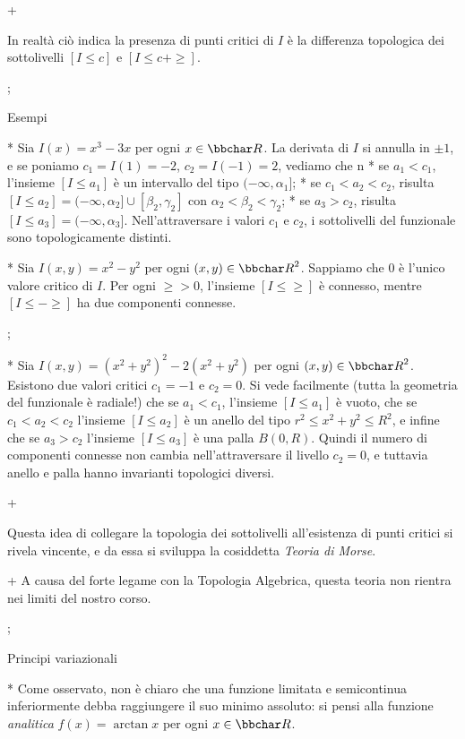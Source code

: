\pg+

In realt\`a ci\`o indica la presenza di punti critici di $I$ \`e la
differenza topologica dei sottolivelli $[I \leq c]$ e $[I \leq
c+\ge]$.

\pg;

\sec Esempi

* Sia $I(x)=x^3-3x$ per ogni $x \in \R$. La derivata di $I$ si annulla
  in $\pm 1$, e se poniamo $c_1=I(1)=-2$, $c_2=I(-1)=2$, vediamo che
  \begitems
  \style n
  * se $a_1<c_1$, l'insieme $[I \leq a_1]$ \`e un intervallo del tipo
  $(-\infty,\alpha_1]$;
  * se $c_1<a_2<c_2$, risulta $[I \leq a_2] = (-\infty,\alpha_2] \cup
  [\beta_2,\gamma_2]$ con $\alpha_2<\beta_2<\gamma_2$;
  * se $a_3>c_2$, risulta $[I \leq a_3] = (-\infty,\alpha_3]$.
  \enditems
  Nell'attraversare i valori $c_1$ e $c_2$, i sottolivelli del
  funzionale sono topologicamente distinti.

* Sia $I(x,y) = x^2-y^2$ per ogni $(x,y) \in \R^2$. Sappiamo che $0$
  \`e l'unico valore critico di $I$. Per ogni $\ge>0$, l'insieme $[I
  \leq \ge]$ \`e connesso, mentre $[I \leq -\ge]$ ha due componenti
  connesse.

\pg;

* Sia $I(x,y) = (x^2+y^2)^2-2(x^2+y^2)$ per ogni $(x,y) \in
  \R^2$. Esistono due valori critici $c_1=-1$ e $c_2=0$. Si vede
  facilmente (tutta la geometria del funzionale \`e radiale!) che se
  $a_1<c_1$, l'insieme $[I \leq a_1]$ \`e vuoto, che se $c_1<a_2<c_2$
  l'insieme $[I \leq a_2]$ \`e un anello del tipo $r^2 \leq x^2+y^2
  \leq R^2$, e infine che se $a_3>c_2$ l'insieme $[I \leq a_3]$ \`e
  una palla $B(0,R)$. Quindi il numero di componenti connesse non
  cambia nell'attraversare il livello $c_2=0$, e tuttavia anello e
  palla hanno invarianti topologici diversi.

\pg+

Questa idea di collegare la topologia dei sottolivelli all'esistenza
di punti critici si rivela vincente, e da essa si sviluppa la
cosiddetta {\em Teoria di Morse}.

\pg+ A causa del forte legame con la Topologia Algebrica, questa
teoria non rientra nei limiti del nostro corso.

\pg;

\sec Principi variazionali

* Come osservato, non \`e chiaro che una funzione limitata e
  semicontinua inferiormente debba raggiungere il suo minimo assoluto:
  si pensi alla funzione {\em analitica} $f(x)=\arctan x$ per ogni $x
  \in \R$.

